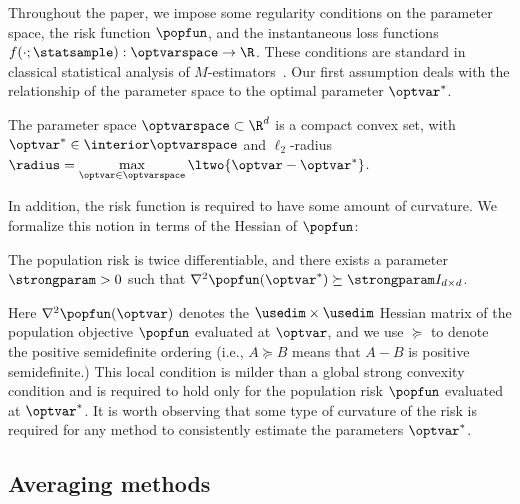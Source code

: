 \documentclass[11pt,twoside]{article}
\theoremstyle{definition}
\begin{document}
Throughout the paper, we impose some regularity conditions on the
parameter space, the risk function $\popfun$, and the instantaneous
loss functions $f(\cdot; \statsample) : \optvarspace \rightarrow \R$.
These conditions are standard in classical statistical analysis of
$M$-estimators~\citep[e.g.][]{LehmannCa98,Keener10}.  Our first
assumption deals with the relationship of the parameter space to the
optimal parameter $\optvar^*$.
\begin{assumption}[Parameters]
  \label{assumption:parameter-space}
  The parameter space $\optvarspace \subset \R^d$ is a compact convex
  set, with \mbox{$\optvar^* \in \interior \optvarspace$} and
  $\ell_2$-radius $\radius = \max \limits_{\optvar \in \optvarspace}
  \ltwo{\optvar - \optvar^*}$.
\end{assumption}
\noindent
In addition, the risk function is required to have some amount of
curvature.  We formalize this notion in terms of the Hessian of
$\popfun$:
%
\begin{assumption}
  \label{assumption:strong-convexity}
  The population risk is twice differentiable, and there exists a
  parameter $\strongparam > 0$ such that \mbox{$\nabla^2
    \popfun(\optvar^*) \succeq \strongparam I_{d \times d}$.}
\end{assumption}
\noindent
Here $\nabla^2 \popfun(\optvar)$ denotes the $\usedim \times \usedim$
Hessian matrix of the population objective $\popfun$ evaluated at
$\optvar$, and we use $\succeq$ to denote the positive semidefinite
ordering (i.e., $A \succeq B$ means that $A - B$ is positive
semidefinite.) This local condition is milder than a global strong
convexity condition and is required to hold only for the population
risk $\popfun$ evaluated at $\optvar^*$.  It is worth observing that
some type of curvature of the risk is required for any method to
consistently estimate the parameters $\optvar^*$.

\subsection{Averaging methods}
\end{document}
